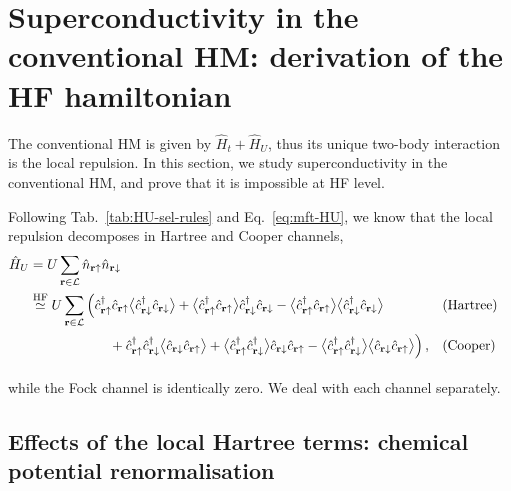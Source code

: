 \section{Superconductivity in the conventional HM: derivation of the HF hamiltonian}\label{sec:sc-hm}

The conventional HM is given by $\hat H_t + \hat H_U$, thus its unique two-body interaction is the local repulsion. In this section, we study superconductivity in the conventional HM, and prove that it is impossible at HF level.

Following Tab.~\ref{tab:HU-sel-rules} and Eq.~\eqref{eq:mft-HU}, we know that the local repulsion decomposes in Hartree and Cooper channels,
\[
\begin{aligned}
	\hat H_U &= U \sum_{\mathbf{r}\in\mathcal{L}} \hat n_{\mathbf{r}\uparrow} \hat n_{\mathbf{r}\downarrow} \\
	&\HFsimeq U \sum_{\mathbf{r}\in\mathcal{L}} \Big(
	\hat c_{\mathbf{r}\uparrow}^\dagger \hat c_{\mathbf{r}\uparrow} \big\langle \hat c_{\mathbf{r}\downarrow}^\dagger \hat c_{\mathbf{r}\downarrow} \big\rangle + \big\langle \hat c_{\mathbf{r}\uparrow}^\dagger \hat c_{\mathbf{r}\uparrow} \big\rangle \hat c_{\mathbf{r}\downarrow}^\dagger \hat c_{\mathbf{r}\downarrow} - \big\langle \hat c_{\mathbf{r}\uparrow}^\dagger \hat c_{\mathbf{r}\uparrow} \big\rangle  \big\langle \hat c_{\mathbf{r}\downarrow}^\dagger \hat c_{\mathbf{r}\downarrow} \big\rangle &&(\text{Hartree}) \\
	&\phantom{\HFsimeq \sum_{{\mathbf{r}\uparrow}\neq{\mathbf{r}\downarrow}} V_{{\mathbf{r}\uparrow}{\mathbf{r}\downarrow}}}
	+ \hat c_{\mathbf{r}\uparrow}^\dagger \hat c_{\mathbf{r}\downarrow}^\dagger \big\langle \hat c_{\mathbf{r}\downarrow} \hat c_{\mathbf{r}\uparrow} \big\rangle + \big\langle \hat c_{\mathbf{r}\uparrow}^\dagger \hat c_{\mathbf{r}\downarrow}^\dagger \big\rangle \hat c_{\mathbf{r}\downarrow} \hat c_{\mathbf{r}\uparrow} - \big\langle \hat c_{\mathbf{r}\uparrow}^\dagger \hat c_{\mathbf{r}\downarrow}^\dagger \big\rangle  \big\langle \hat c_{\mathbf{r}\downarrow} \hat c_{\mathbf{r}\uparrow} \big\rangle
	\Big) \, , &&(\text{Cooper})
\end{aligned}
\]
while the Fock channel is identically zero. We deal with each channel separately.


\subsection{Effects of the local Hartree terms: chemical potential renormalisation}


